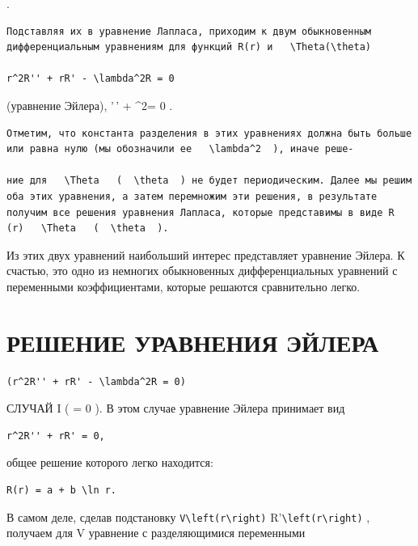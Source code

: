\documentclass[
  ukrainian,
]{article}
\begin{document}
.

\begin{verbatim}
Подставляя их в уравнение Лапласа, приходим к двум обыкновенным дифференциальным уравнениям для функций R(r) и   \Theta(\theta)

r^2R'' + rR' - \lambda^2R = 0
\end{verbatim}

(уравнение Эйлера), \Theta'\,' + \lambda\^{}2\Theta = 0 .

\begin{verbatim}
Отметим, что константа разделения в этих уравнениях должна быть больше или равна нулю (мы обозначили ее   \lambda^2  ), иначе реше-

ние для   \Theta   (  \theta  ) не будет периодическим. Далее мы решим оба этих уравнения, а затем перемножим эти решения, в результате получим все решения уравнения Лапласа, которые представимы в виде R (r)   \Theta   (  \theta  ).
\end{verbatim}

Из этих двух уравнений наибольший интерес представляет уравнение Эйлера.
К счастью, это одно из немногих обыкновенных дифференциальных уравнений
с переменными коэффициентами, которые решаются сравнительно легко.

\section{РЕШЕНИЕ УРАВНЕНИЯ
ЭЙЛЕРА}\label{ux440ux435ux448ux435ux43dux438ux435-ux443ux440ux430ux432ux43dux435ux43dux438ux44f-ux44dux439ux43bux435ux440ux430}

\begin{verbatim}
(r^2R'' + rR' - \lambda^2R = 0)
\end{verbatim}

СЛУЧАЙ I ( \lambda = 0 ). В этом случае уравнение Эйлера принимает вид

\begin{verbatim}
r^2R'' + rR' = 0,
\end{verbatim}

общее решение которого легко находится:

\begin{verbatim}
R(r) = a + b \ln r.
\end{verbatim}

В самом деле, сделав подстановку
\texttt{V\textbackslash{}left(r\textbackslash{}right)}
\Rightarrow R'\texttt{\textbackslash{}left(r\textbackslash{}right)} ,
получаем для V уравнение с разделяющимися переменными
\end{document}
